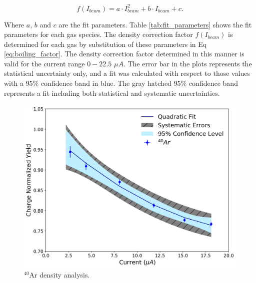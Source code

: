 \documentclass[final,5p,times,twocolumn]{elsarticle}
\begin{document}
\begin{equation}
f(I_{beam}) = a\cdot I_{beam}^{2} + b \cdot I_{beam} + c.
\label{eq:boiling_factor}
\end{equation}

\noindent Where $a$, $b$ and $c$ are the fit parameters. Table \ref{tab:fit_parameters} shows the fit parameters for each gas species. The density correction factor $f(I_{beam})$ is determined for each gas by substitution of these parameters in Eq \ref{eq:boiling_factor}. The density correction factor determined in this manner is valid for the current range $0-22.5$ $\mu A$. The error bar in the plots represents the statistical uncertainty only, and a fit was calculated with respect to those values with a $95\%$ confidence band in blue. The gray hatched $95\%$ confidence band represents a fit including both statistical and systematic uncertainties.

\begin{figure}[!h]
	\centering
	\includegraphics[width=\linewidth]{images/argon_data.pdf}
	\caption{$^{40}$Ar density analysis.}
	\label{fig:argon_data}
\end{figure}
\end{document}
